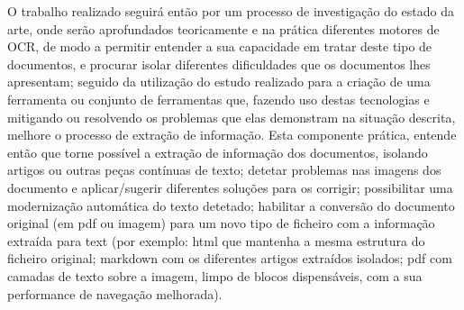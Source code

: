 O trabalho realizado seguirá então por um processo de investigação do estado da arte, onde serão aprofundados teoricamente e na prática diferentes motores de OCR, de modo a permitir entender a sua capacidade em tratar deste tipo de documentos, e procurar isolar diferentes dificuldades que os documentos lhes apresentam; seguido da utilização do estudo realizado para a criação de uma ferramenta ou conjunto de ferramentas que, fazendo uso destas tecnologias e mitigando ou resolvendo os problemas que elas demonstram na situação descrita, melhore o processo de extração de informação. Esta componente prática, entende então que torne possível a extração de informação dos documentos, isolando artigos ou outras peças contínuas de texto; detetar problemas nas imagens dos documento e aplicar/sugerir diferentes soluções para os corrigir; possibilitar uma modernização automática do texto detetado; habilitar a conversão do documento original (em pdf ou imagem) para um novo tipo de ficheiro com a informação extraída para text (por exemplo: html que mantenha a mesma estrutura do ficheiro original; markdown com os diferentes artigos extraídos isolados; pdf com camadas de texto sobre a imagem, limpo de blocos dispensáveis, com a sua performance de navegação melhorada).
